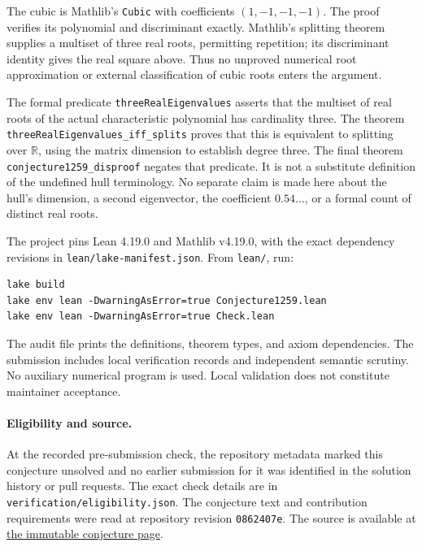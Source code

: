 \documentclass[11pt]{article}
\begin{document}
The cubic is Mathlib's \texttt{Cubic} with coefficients $(1,-1,-1,-1)$. The proof verifies its polynomial and discriminant exactly. Mathlib's splitting theorem supplies a multiset of three real roots, permitting repetition; its discriminant identity gives the real square above. Thus no unproved numerical root approximation or external classification of cubic roots enters the argument.

The formal predicate \texttt{threeRealEigenvalues} asserts that the multiset of real roots of the actual characteristic polynomial has cardinality three. The theorem \texttt{threeRealEigenvalues\_iff\_splits} proves that this is equivalent to splitting over $\mathbb R$, using the matrix dimension to establish degree three. The final theorem \texttt{conjecture1259\_disproof} negates that predicate. It is not a substitute definition of the undefined hull terminology. No separate claim is made here about the hull's dimension, a second eigenvector, the coefficient $0.54\ldots$, or a formal count of distinct real roots.

The project pins Lean 4.19.0 and Mathlib v4.19.0, with the exact dependency revisions in \texttt{lean/lake-manifest.json}. From \texttt{lean/}, run:
\begin{verbatim}
lake build
lake env lean -DwarningAsError=true Conjecture1259.lean
lake env lean -DwarningAsError=true Check.lean
\end{verbatim}
The audit file prints the definitions, theorem types, and axiom dependencies. The submission includes local verification records and independent semantic scrutiny. No auxiliary numerical program is used. Local validation does not constitute maintainer acceptance.

\paragraph{Eligibility and source.}
At the recorded pre-submission check, the repository metadata marked this conjecture unsolved and no earlier submission for it was identified in the solution history or pull requests. The exact check details are in \texttt{verification/eligibility.json}. The conjecture text and contribution requirements were read at repository revision \texttt{0862407e}. The source is available at \href{https://github.com/The-Last-Math-Competition/The-Last-Math-Competition/blob/0862407ef50dda4f7376342ca3e79368dce942d2/conjectures/00000001259.md}{the immutable conjecture page}.
\end{document}

